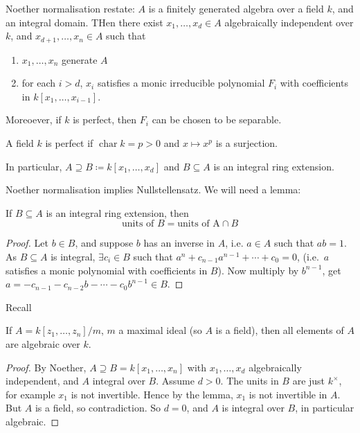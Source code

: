 \documentclass{article}
\DeclareMathOperator{\chara}{char}
\begin{document}
Noether normalisation restate: $A$ is a finitely generated algebra over a field $k$, and an integral domain. THen there exist $x_1, \dotsc, x_d \in A$ algebraically independent over $k$, and $x_{d+1}, \dotsc, x_n \in A$ such that
\begin{enumerate}[label=(\roman*)]
    \item $x_1, \dotsc, x_n$ generate $A$
    \item for each $i > d$, $x_i$ satisfies a monic irreducible polynomial $F_i$ with coefficients in $k[x_1, \dotsc, x_{i-1}]$.
\end{enumerate}
Moreoever, if $k$ is perfect, then $F_i$ can be chosen to be separable.
\begin{defi}[Perfect]
    A field $k$ is perfect if $\chara k = p > 0$ and $x \mapsto x^p$ is a surjection.
\end{defi}
\begin{remark}
    In particular, $A \supseteq B \coloneqq k[x_1, \dotsc, x_d]$ and $B \subseteq A$ is an integral ring extension.
\end{remark}
Noether normalisation implies Nullstellensatz.
We will need a lemma:
\begin{lemma}
    If $B \subseteq A$ is an integral ring extension, then
    \begin{equation*}
        \text{units of } B = \text{units of A} \cap B
    \end{equation*}
\end{lemma}
\begin{proof}
    Let $b \in B$, and suppose $b$ has an inverse in $A$, i.e. $a \in A$ such that $ab = 1$.
    As $B \subseteq A$ is integral, $\exists c_i \in B$ such that $a^n + c_{n-1} a^{n-1} + \dotsb + c_0 = 0$, (i.e.\ $a$ satisfies a monic polynomial with coefficients in $B$).
    Now multiply by $b^{n-1}$, get $a = -c_{n-1} - c_{n-2} b - \dotsb - c_0 b^{n-1} \in B$.
\end{proof}
Recall
\begin{thm}[Nullstellensatz]
    If $A = k[z_1, \dotsc, z_n]/m$, $m$ a maximal ideal (so $A$ is a field), then all elements of $A$ are algebraic over $k$.
\end{thm}
\begin{proof}
    By Noether, $A \supseteq B = k[x_1, \dotsc, x_n]$ with $x_1, \dotsc, x_d$ algebraically independent, and $A$ integral over $B$.
    Assume $d > 0$.  The units in $B$ are just $k^\times$, for example $x_1$ is not invertible.
    Hence by the lemma, $x_1$ is not invertible in $A$. But $A$ is a field, so contradiction.
    So $d = 0$, and $A$ is integral over $B$, in particular algebraic.
\end{proof}
\end{document}
